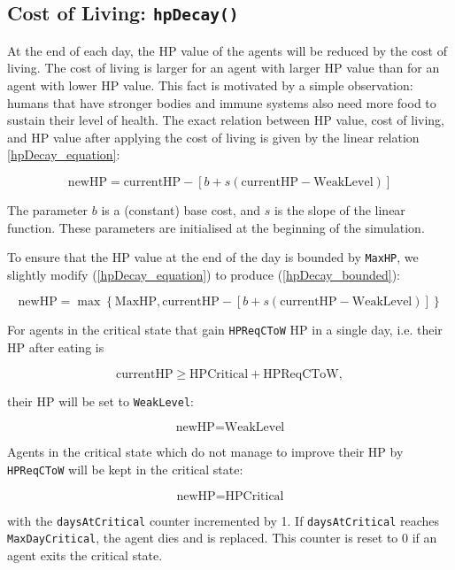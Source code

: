 \subsection{Cost of Living: \texorpdfstring{\lstinline$hpDecay()$}{hpDecay}}\label{hpDecay}
At the end of each day, the HP value of the agents will be reduced by the cost of living. The cost of living is larger for an agent with larger HP value than for an agent with lower HP value. This fact is motivated by a simple observation: humans that have stronger bodies and immune systems also need more food to sustain their level of health. The exact relation between HP value, cost of living, and HP value after applying the cost of living is given by the linear relation \eqref{hpDecay_equation}:

\begin{equation}\label{hpDecay_equation}
    \text{newHP} = \text{currentHP}-\left[b + s(\text{currentHP}-\text{WeakLevel})\right]
\end{equation}


The parameter $b$ is a (constant) base cost, and $s$ is the slope of the linear function. These parameters are initialised at the beginning of the simulation. 

To ensure that the HP value at the end of the day is bounded by \texttt{MaxHP}, we slightly modify (\ref{hpDecay_equation}) to produce (\ref{hpDecay_bounded}):

\begin{equation}\label{hpDecay_bounded}
    \text{newHP} =\max\left\{\text{MaxHP}, \text{currentHP}-\left[b + s(\text{currentHP}-\text{WeakLevel})\right]\right\}
\end{equation}

For agents in the critical state that gain \texttt{HPReqCToW} HP in a single day, i.e. their HP after eating is

\begin{equation}\label{HPReqCToW}
    \text{currentHP} \geq \text{HPCritical}+\text{HPReqCToW},
\end{equation}

their HP will be set to \texttt{WeakLevel}:

\begin{equation}\label{hpDecay_critical_upgrade}
    \text{newHP} = \text{WeakLevel}
\end{equation}

Agents in the critical state which do not manage to improve their HP by \lstinline$HPReqCToW$ will be kept in the critical state:

\begin{equation}\label{hpDecay_critical_stay}
    \text{newHP} = \text{HPCritical}
\end{equation}

with the \texttt{daysAtCritical} counter incremented by 1. If \texttt{daysAtCritical} reaches \texttt{MaxDayCritical}, the agent dies and is replaced. This counter is reset to 0 if an agent exits the critical state.